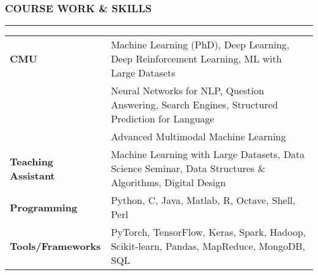 \documentclass[10pt,a4paper,English]{article}
\newcommand\roottitle[1]{\vspace{-4mm}\subsubsection*{\uppercase{#1}}\vspace{-0.3em}\nopagebreak[4]\hrule\vspace{4mm}}
\newcommand\itemyear[1]{\hfill \emph{\color{itemyear} #1}}
\newcommand\itemenv{\setlength\itemsep{0.5pt} \addtolength{\itemindent}{-5mm}\vspace{-1.5mm}}
\begin{document}
\roottitle{Course Work \& Skills}
\vspace{-2mm}
\renewcommand{\arraystretch}{1.2}
\setlength\tabcolsep{0pt}
\begin{tabularx}{\textwidth}{ l @{ - } X }
\textbf{CMU}                        & Machine Learning (PhD), Deep Learning, Deep Reinforcement Learning, ML with Large Datasets  \\
                                    & Neural Networks for NLP, Question Answering, Search Engines, Structured Prediction for Language \\
                                    & Advanced Multimodal Machine Learning \\
\textbf{Teaching Assistant}         & Machine Learning with Large Datasets, Data Science Seminar, Data Structures \& Algorithms, Digital Design \\
\textbf{Programming}                & Python, C, Java, Matlab, R, Octave, Shell, Perl \\
\textbf{Tools/Frameworks}           & PyTorch, TensorFlow, Keras, Spark, Hadoop, Scikit-learn, Pandas, MapReduce, MongoDB, SQL \\
\end{tabularx}
\vspace{2mm}

\vspace{1mm}

\noindent {}\\
\end{document}
